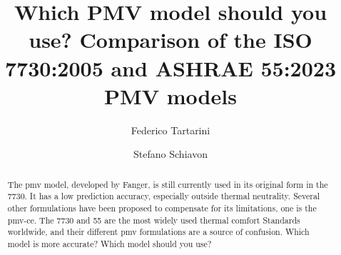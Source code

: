 \begin{frontmatter}

    \title{Which PMV model should you use? Comparison of the ISO 7730:2005 and ASHRAE 55:2023 PMV models}

    \author[label1,label2]{Federico Tartarini}
    \author[label3]{Stefano Schiavon}

    \address[label1]{University of Sydney, Sydney, AU}
    \address[label2]{Berkeley Education Alliance for Research in Singapore, Singapore}
    \address[label3]{Center for the Built Environment, University of California, Berkeley, CA, USA}


    \begin{abstract}

        The \ac{pmv} model, developed by Fanger, is still currently used in its original form in the \gls{7730}.
        It has a low prediction accuracy, especially outside thermal neutrality.
        Several other formulations have been proposed to compensate for its limitations, one is the \ac{pmv-ce}.
        The \gls{7730} and \gls{55} are the most widely used thermal comfort Standards worldwide, and their different \ac{pmv} formulations are a source of confusion.
        Which model is more accurate?
        Which model should you use?


\end{abstract}
\end{frontmatter}
